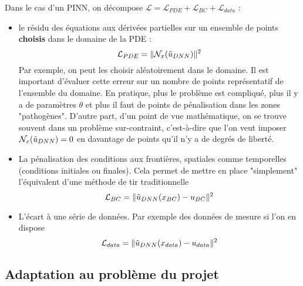 Dans le cas d'un PINN, on décompose $\mathcal{L} = \mathcal{L}_{PDE} + \mathcal{L}_{BC} + \mathcal{L}_{data}$ :
\begin{itemize}
    \item le résidu des équations aux dérivées partielles sur un ensemble de points \textbf{choisis} dans le domaine de la PDE :
    \begin{equation}
        \mathcal{L}_{PDE} = \| \mathcal{N}_x(\Tilde{u}_{DNN})\|^2
    \end{equation}
    Par exemple, on peut les choisir aléatoirement dans le domaine. Il est important d'évaluer cette erreur sur un nombre de points représentatif de l'ensemble du domaine. En pratique, plus le problème est compliqué, plus il y a de paramètres $\theta$ et plus il faut de points de pénalisation dans les zones "pathogènes". D'autre part, d'un point de vue mathématique, on se trouve souvent dans un problème sur-contraint, c'est-à-dire que l'on veut imposer $\mathcal{N}_x(\Tilde{u}_{DNN})=0$ en davantage de points qu'il n'y a de degrés de liberté.
    \item La pénalisation des conditions aux frontières, spatiales comme temporelles (conditions initiales ou finales). Cela permet de mettre en place "simplement" l'équivalent d'une méthode de tir traditionnelle
        \begin{equation}
        \mathcal{L}_{BC} = \| \Tilde{u}_{DNN}(x_{BC}) - u_{BC}\|^2
    \end{equation}
    \item L'écart à une série de données. Par exemple des données de mesure si l'on en dispose 
        \begin{equation}
        \mathcal{L}_{data} = \| \Tilde{u}_{DNN}(x_{data}) - u_{data}\|^2
    \end{equation}
\end{itemize}



\subsection{Adaptation au problème du projet}

